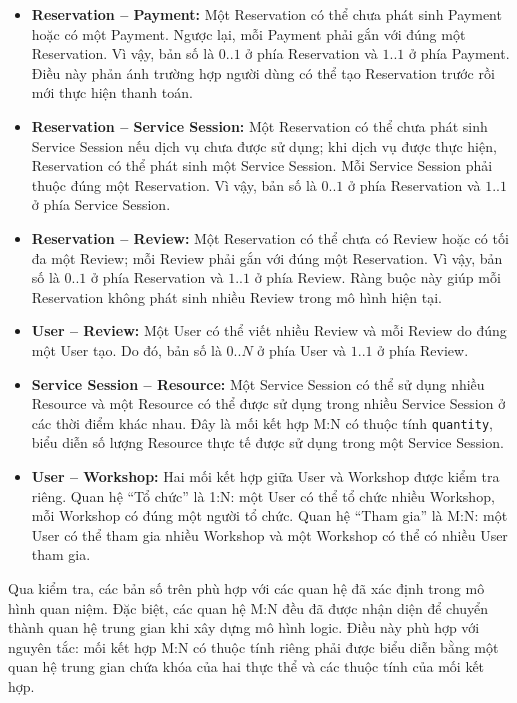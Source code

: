 \begin{itemize}
\item \textbf{Reservation -- Payment:} Một Reservation có thể chưa phát sinh Payment hoặc có một Payment. Ngược lại, mỗi Payment phải gắn với đúng một Reservation. Vì vậy, bản số là $0..1$ ở phía Reservation và $1..1$ ở phía Payment. Điều này phản ánh trường hợp người dùng có thể tạo Reservation trước rồi mới thực hiện thanh toán.

\item \textbf{Reservation -- Service Session:} Một Reservation có thể chưa phát sinh Service Session nếu dịch vụ chưa được sử dụng; khi dịch vụ được thực hiện, Reservation có thể phát sinh một Service Session. Mỗi Service Session phải thuộc đúng một Reservation. Vì vậy, bản số là $0..1$ ở phía Reservation và $1..1$ ở phía Service Session.

\item \textbf{Reservation -- Review:} Một Reservation có thể chưa có Review hoặc có tối đa một Review; mỗi Review phải gắn với đúng một Reservation. Vì vậy, bản số là $0..1$ ở phía Reservation và $1..1$ ở phía Review. Ràng buộc này giúp mỗi Reservation không phát sinh nhiều Review trong mô hình hiện tại.

\item \textbf{User -- Review:} Một User có thể viết nhiều Review và mỗi Review do đúng một User tạo. Do đó, bản số là $0..N$ ở phía User và $1..1$ ở phía Review.

\item \textbf{Service Session -- Resource:} Một Service Session có thể sử dụng nhiều Resource và một Resource có thể được sử dụng trong nhiều Service Session ở các thời điểm khác nhau. Đây là mối kết hợp M:N có thuộc tính \texttt{quantity}, biểu diễn số lượng Resource thực tế được sử dụng trong một Service Session.

\item \textbf{User -- Workshop:} Hai mối kết hợp giữa User và Workshop được kiểm tra riêng. Quan hệ ``Tổ chức'' là 1:N: một User có thể tổ chức nhiều Workshop, mỗi Workshop có đúng một người tổ chức. Quan hệ ``Tham gia'' là M:N: một User có thể tham gia nhiều Workshop và một Workshop có thể có nhiều User tham gia.

\end{itemize}

Qua kiểm tra, các bản số trên phù hợp với các quan hệ đã xác định trong mô hình quan niệm. Đặc biệt, các quan hệ M:N đều đã được nhận diện để chuyển thành quan hệ trung gian khi xây dựng mô hình logic. Điều này phù hợp với nguyên tắc: mối kết hợp M:N có thuộc tính riêng phải được biểu diễn bằng một quan hệ trung gian chứa khóa của hai thực thể và các thuộc tính của mối kết hợp.

